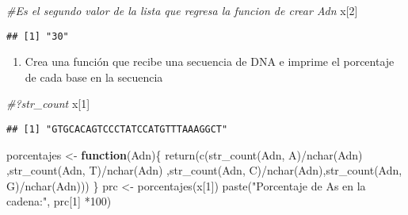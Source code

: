 \documentclass[
]{article}
\newenvironment{Shaded}{\begin{snugshade}}{\end{snugshade}}
\newcommand{\CommentTok}[1]{\textcolor[rgb]{0.56,0.35,0.01}{\textit{#1}}}
\newcommand{\ControlFlowTok}[1]{\textcolor[rgb]{0.13,0.29,0.53}{\textbf{#1}}}
\newcommand{\DecValTok}[1]{\textcolor[rgb]{0.00,0.00,0.81}{#1}}
\newcommand{\FunctionTok}[1]{\textcolor[rgb]{0.00,0.00,0.00}{#1}}
\newcommand{\NormalTok}[1]{#1}
\newcommand{\OtherTok}[1]{\textcolor[rgb]{0.56,0.35,0.01}{#1}}
\newcommand{\SpecialCharTok}[1]{\textcolor[rgb]{0.00,0.00,0.00}{#1}}
\newcommand{\StringTok}[1]{\textcolor[rgb]{0.31,0.60,0.02}{#1}}
\providecommand{\tightlist}{%
  \setlength{\itemsep}{0pt}\setlength{\parskip}{0pt}}
\begin{document}
\begin{Shaded}
\begin{Highlighting}[]
\CommentTok{\#Es el segundo valor de la lista que regresa la funcion de crear Adn}
\NormalTok{x[}\DecValTok{2}\NormalTok{]}
\end{Highlighting}
\end{Shaded}

\begin{verbatim}
## [1] "30"
\end{verbatim}

\begin{enumerate}
\def\labelenumi{\arabic{enumi}.}
\setcounter{enumi}{2}
\tightlist
\item
  Crea una función que recibe una secuencia de DNA e imprime el
  porcentaje de cada base en la secuencia
\end{enumerate}

\begin{Shaded}
\begin{Highlighting}[]
\CommentTok{\#?str\_count}
\NormalTok{x[}\DecValTok{1}\NormalTok{]}
\end{Highlighting}
\end{Shaded}

\begin{verbatim}
## [1] "GTGCACAGTCCCTATCCATGTTTAAAGGCT"
\end{verbatim}

\begin{Shaded}
\begin{Highlighting}[]
\NormalTok{porcentajes }\OtherTok{\textless{}{-}} \ControlFlowTok{function}\NormalTok{(Adn)\{}
  \FunctionTok{return}\NormalTok{(}\FunctionTok{c}\NormalTok{(}\FunctionTok{str\_count}\NormalTok{(Adn, }\StringTok{\textquotesingle{}A\textquotesingle{}}\NormalTok{)}\SpecialCharTok{/}\FunctionTok{nchar}\NormalTok{(Adn)  ,}\FunctionTok{str\_count}\NormalTok{(Adn, }\StringTok{\textquotesingle{}T\textquotesingle{}}\NormalTok{)}\SpecialCharTok{/}\FunctionTok{nchar}\NormalTok{(Adn) ,}\FunctionTok{str\_count}\NormalTok{(Adn, }\StringTok{\textquotesingle{}C\textquotesingle{}}\NormalTok{)}\SpecialCharTok{/}\FunctionTok{nchar}\NormalTok{(Adn),}\FunctionTok{str\_count}\NormalTok{(Adn, }\StringTok{\textquotesingle{}G\textquotesingle{}}\NormalTok{)}\SpecialCharTok{/}\FunctionTok{nchar}\NormalTok{(Adn)))}
\NormalTok{\}}
\NormalTok{prc }\OtherTok{\textless{}{-}} \FunctionTok{porcentajes}\NormalTok{(x[}\DecValTok{1}\NormalTok{])}
\FunctionTok{paste}\NormalTok{(}\StringTok{"Porcentaje de A\textquotesingle{}s en la cadena:"}\NormalTok{, prc[}\DecValTok{1}\NormalTok{] }\SpecialCharTok{*}\DecValTok{100}\NormalTok{)}
\end{Highlighting}
\end{Shaded}
\end{document}
